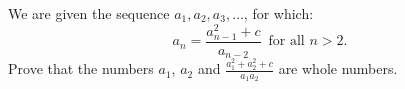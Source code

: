 We are given the sequence $a_1,a_2,a_3,\ldots$, for which:
$$a_n=\frac{a^2_{n-1}+c}{a_{n-2}}\enspace\text{for all }n>2.$$Prove that the numbers $a_1$, $a_2$ and $\frac{a_1^2+a_2^2+c}{a_1a_2}$ are whole numbers.
